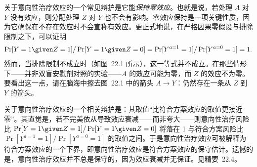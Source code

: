 关于意向性治疗效应的一个常见辩护是它能\emph{保持零效应}。也就是说，若处理 $A$ 对 $Y$ 没有效应，则分配处理 $Z$ 对 $Y$ 也不会有影响。零效应保持是一项关键性质，因为它确保在不存在效应时不会宣称有效应。更正式地说，在严格因果零假设与排除限制之下，可以证明
\[
\Pr[Y=1\given Z=1]/\Pr[Y=1\given Z=0]=\Pr[Y^{a=1}=1]/\Pr[Y^{a=0}=1]=1.
\]
然而，当排除限制不成立时（如图~22.1 所示），这一等式并不成立。在那些情形下——并非双盲安慰剂对照的实验——$A$ 的效应可能为零，而 $Z$ 的效应不为零。要看出这一点，请在脑海中擦去图~22.1 中的箭头 $A\to Y$：仍然存在一条从 $Z$ 到 $Y$ 的箭头。

关于意向性治疗效应的一个相关辩护是：其取值“比符合方案效应的取值更接近零”。其直觉是，若不完美依从导致效应衰减——而非夸大——则意向性治疗风险比 $\Pr[Y=1\given Z=1]/\Pr[Y=1\given Z=0]$ 将落在 1 与符合方案风险比 $\Pr[Y^{a=1}=1]/\Pr[Y^{a=0}=1]$ 的取值之间。于是意向性治疗效应可被解释为符合方案效应的一个下界，即意向性治疗效应是符合方案效应的保守估计。遗憾的是，意向性治疗效应并不总是保守的，因为效应衰减并无保证。见精要~22.4。

